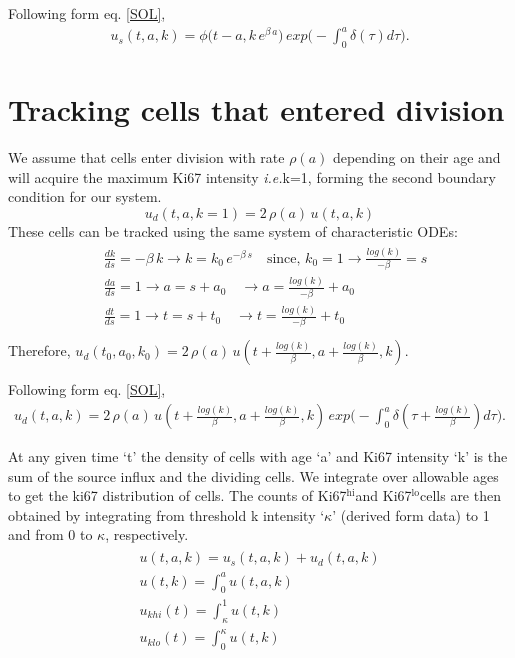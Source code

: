 \documentclass[11pt]{article}
\newcommand{\ie}{\textit{i.e.}}
\newcommand{\khi}{Ki67$^\text{hi}$}
\newcommand{\klo}{Ki67$^\text{lo}$}
\begin{document}
Following form eq. \ref{SOL},
\begin{eqnarray}
	u_{s}(t, a, k) = \phi\bigg(t-a, k \, e^{\beta \, a}\bigg) \, exp\bigg(- \int_0^a \delta(\tau) d\tau\bigg). 
\end{eqnarray}

\section*{Tracking cells that entered division}

We assume that cells enter division with rate $\rho(a)$ depending on their age and will acquire the maximum Ki67 intensity \ie k=1, forming the second boundary condition for our system.
\begin{equation*}
	u_{d}(t, a, k=1) = 2 \, \rho(a) \, u(t, a, k)
\end{equation*}
These cells can be tracked using the same system of characteristic ODEs:
\begin{eqnarray*}
	\begin{aligned}
		&\frac{dk}{ds} = -\beta \, k \rightarrow k = k_0 \, e^{-\beta \, s} \quad \text{since,  } k_0 = 1 \rightarrow \frac{log(k)}{-\beta} =  s \\
		&\frac{da}{ds} = 1 \rightarrow a = s + a_0 \quad \rightarrow a = \frac{log(k)}{-\beta} + a_0\\
		&\frac{dt}{ds} = 1 \rightarrow t = s + t_0 \quad \rightarrow t = \frac{log(k)}{-\beta} + t_0\\
	\end{aligned}
\end{eqnarray*}
Therefore, $u_{d}(t_0, a_0, k_0) = 2 \, \rho(a) \, u(t + \frac{log(k)}{\beta}, a + \frac{log(k)}{\beta}, k).$

Following form eq. \ref{SOL},
\begin{eqnarray}
u_{d}(t, a, k) = 2 \, \rho(a) \, u(t + \frac{log(k)}{\beta}, a + \frac{log(k)}{\beta}, k) \, exp\bigg(- \int_0^a \delta(\tau + \frac{log(k)}{\beta}) d\tau\bigg). 
\end{eqnarray}

At any given time `t' the density of cells with age `a' and Ki67 intensity `k' is the sum of the source influx and the dividing cells.
We integrate over allowable ages to get the ki67 distribution of cells. 
The counts of \khi and \klo cells are then obtained by integrating from threshold k intensity `$\kappa$' (derived form data) to 1 and from 0 to $\kappa$, respectively. 
\begin{eqnarray}
	\begin{aligned}
	u(t, a, k) = u_s(t,a,k) + u_d(t,a,k) \\
	u(t,k) = \int_0^a u(t,a,k) \\
	u_{khi}(t) = \int_{\kappa}^1 u(t,k) \\
	u_{klo}(t) = \int_0^{\kappa} u(t,k) \\
	\end{aligned}
\end{eqnarray}









	
	
\end{document}
